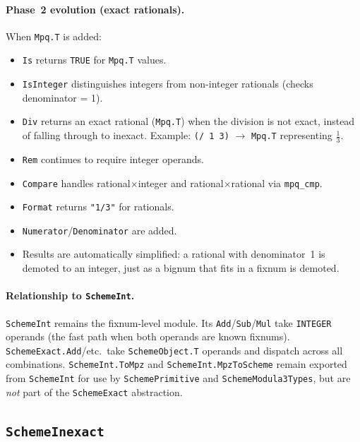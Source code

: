 \documentclass[12pt]{article}
\begin{document}
\paragraph{Phase~2 evolution (exact rationals).}
When {\tt Mpq.T} is added:
\begin{itemize}[nosep]
\item {\tt Is} returns {\tt TRUE} for {\tt Mpq.T} values.
\item {\tt IsInteger} distinguishes integers from non-integer
  rationals (checks denominator = 1).
\item {\tt Div} returns an exact rational ({\tt Mpq.T}) when the
  division is not exact, instead of falling through to inexact.
  Example: {\tt (/ 1 3)} $\to$ {\tt Mpq.T} representing $\frac{1}{3}$.
\item {\tt Rem} continues to require integer operands.
\item {\tt Compare} handles rational$\times$integer and
  rational$\times$rational via {\tt mpq\_cmp}.
\item {\tt Format} returns {\tt "1/3"} for rationals.
\item {\tt Numerator}/{\tt Denominator} are added.
\item Results are automatically simplified: a rational with
  denominator~1 is demoted to an integer, just as a bignum that
  fits in a fixnum is demoted.
\end{itemize}

\paragraph{Relationship to {\tt SchemeInt}.}
{\tt SchemeInt} remains the fixnum-level module.  Its
{\tt Add}/{\tt Sub}/{\tt Mul} take {\tt INTEGER} operands (the
fast path when both operands are known fixnums).
{\tt SchemeExact.Add}/etc.\ take {\tt SchemeObject.T} operands
and dispatch across all combinations.
{\tt SchemeInt.ToMpz} and {\tt SchemeInt.MpzToScheme} remain
exported from {\tt SchemeInt} for use by {\tt SchemePrimitive}
and {\tt SchemeModula3Types}, but are \emph{not} part of the
{\tt SchemeExact} abstraction.

\subsection{{\tt SchemeInexact}}
\label{sec:iface-inexact}
\end{document}
